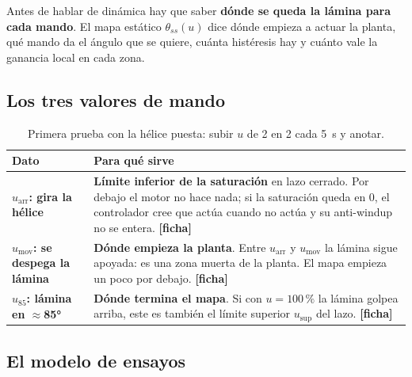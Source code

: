 \documentclass[11pt,letterpaper]{article}
\newcommand{\ficha}{\textcolor{verdeOK}{\textbf{[ficha]}}}  %
\begin{document}
Antes de hablar de dinámica hay que saber \textbf{dónde se queda la lámina para cada mando}. El mapa estático $\theta_{ss}(u)$ dice dónde empieza a actuar la planta, qué mando da el ángulo que se quiere, cuánta histéresis hay y cuánto vale la ganancia local en cada zona.

\subsection{Los tres valores de mando}

\begin{table}[H]\centering\small
\caption{Primera prueba con la hélice puesta: subir $u$ de 2 en 2 cada 5~s y anotar.}\label{tab:tresvalores}
\begin{tabularx}{\linewidth}{@{}>{\bfseries}p{4.2cm} >{\raggedright\arraybackslash}X@{}}\toprule
Dato & Para qué sirve\\\midrule
$u_\text{arr}$: gira la hélice & \textbf{Límite inferior de la saturación} en lazo cerrado. Por debajo el motor no hace nada; si la saturación queda en 0, el controlador cree que actúa cuando no actúa y su anti-windup no se entera. \ficha\\
$u_\text{mov}$: se despega la lámina & \textbf{Dónde empieza la planta}. Entre $u_\text{arr}$ y $u_\text{mov}$ la lámina sigue apoyada: es una zona muerta de la planta. El mapa empieza un poco por debajo. \ficha\\
$u_{85}$: lámina en $\approx$85° & \textbf{Dónde termina el mapa}. Si con $u=100\,\%$ la lámina golpea arriba, este es también el límite superior $u_\text{sup}$ del lazo. \ficha\\\bottomrule
\end{tabularx}
\end{table}

\subsection{El modelo de ensayos}\label{sec:modeloensayos}
\end{document}
